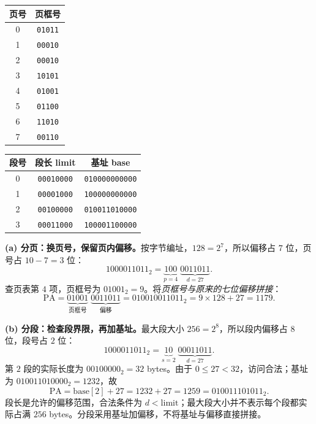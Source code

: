 \begin{center}
\begin{minipage}[t]{0.34\textwidth}
\centering
\begin{tabular}[t]{@{}cc@{}}
\toprule
页号 & 页框号 \\
\midrule
0 & \texttt{01011} \\
1 & \texttt{00010} \\
2 & \texttt{00010} \\
3 & \texttt{10101} \\
4 & \texttt{01001} \\
5 & \texttt{01100} \\
6 & \texttt{11010} \\
7 & \texttt{00110} \\
\bottomrule
\end{tabular}
\end{minipage}\hfill
\begin{minipage}[t]{0.61\textwidth}
\centering
\begin{tabular}[t]{@{}ccc@{}}
\toprule
段号 & 段长 limit & 基址 base \\
\midrule
0 & \texttt{00010000} & \texttt{010000000000} \\
1 & \texttt{00001000} & \texttt{100000000000} \\
2 & \texttt{00100000} & \texttt{010011010000} \\
3 & \texttt{00011000} & \texttt{100001100000} \\
\bottomrule
\end{tabular}
\end{minipage}
\end{center}

\begin{checkedsolution}
\textbf{(a) 分页：换页号，保留页内偏移。}按字节编址，$128=2^7$，所以偏移占 $7$ 位，页号占 $10-7=3$ 位：
\[
  1000011011_2=\underbrace{100}_{p=4}\;\underbrace{0011011}_{d=27}.
\]
查页表第 $4$ 项，页框号为 $01001_2=9$。将\emph{页框号与原来的七位偏移拼接}：
\[
  \text{PA}=\underbrace{01001}_{\text{页框号}}\;\underbrace{0011011}_{\text{偏移}}
  =\boxed{010010011011_2}=9\times128+27=1179.
\]

\textbf{(b) 分段：检查段界限，再加基址。}最大段大小 $256=2^8$，所以段内偏移占 $8$ 位，段号占 $2$ 位：
\[
  1000011011_2=\underbrace{10}_{s=2}\;\underbrace{00011011}_{d=27}.
\]
第 $2$ 段的实际长度为 $00100000_2=32$ bytes。由于 $0\le27<32$，访问合法；基址为 $010011010000_2=1232$，故
\[
  \text{PA}=\text{base}[2]+27=1232+27=\boxed{1259=010011101011_2}.
\]
段长是允许的偏移范围，合法条件为 $d<\text{limit}$；最大段大小并不表示每个段都实际占满 $256$ bytes。分段采用基址加偏移，不将基址与偏移直接拼接。
\end{checkedsolution}

